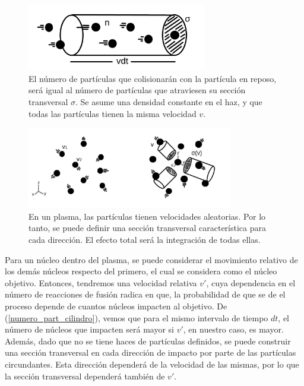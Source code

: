 \documentclass[../main.tex]{subfiles}
\begin{document}
	\begin{figure}[h] 
        \centering
        \includegraphics[width=0.7\textwidth]{Images/cap3_1.jpg}
        \caption{El número de partículas que colisionarán con la partícula en reposo, será igual al número de partículas que atraviesen su sección transversal $\sigma$. Se asume una densidad constante en el haz, y que todas las partículas tienen la misma velocidad $v$.}
        \label{fig:sec_trans1}
\end{figure}
\begin{figure}[h] 
        \centering
        \includegraphics[width=0.8\textwidth]{Images/cap3_2.jpg}
        \caption{En un plasma, las partículas tienen velocidades aleatorias. Por lo tanto, se puede definir una sección transversal característica para cada dirección. El efecto total será la integración de todas ellas.}
        \label{fig:sec_trans2}
\end{figure}
	
	Para un núcleo dentro del plasma, se puede considerar el movimiento relativo de los demás núcleos respecto del primero, el cual se considera como el núcleo objetivo. Entonces, tendremos una velocidad relativa $v'$, cuya dependencia en el número de reacciones de fusión radica en que, la probabilidad de que se de el proceso depende de cuantos núcleos impacten al objetivo. De (\ref{numero_part_cilindro}), vemos que para el mismo intervalo de tiempo $dt$, el número de núcleos que impacten será mayor si $v'$, en nuestro caso, es mayor. Además, dado que no se tiene haces de partículas definidos, se puede construir una sección transversal en cada dirección de impacto por parte de las partículas circundantes.
	Esta dirección dependerá de la velocidad de las mismas, por lo que la sección transversal dependerá también de $v'$. \\
	
\end{document}

